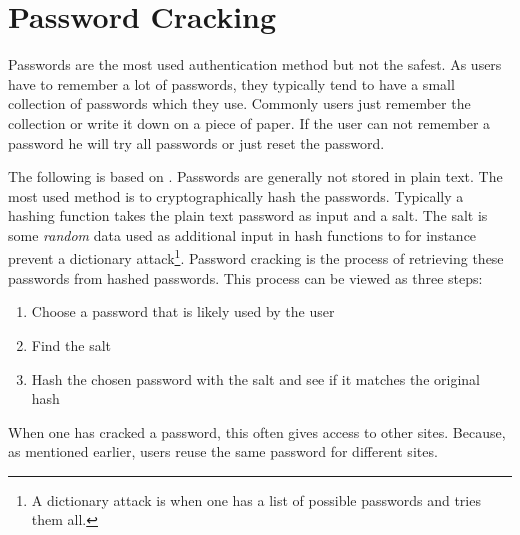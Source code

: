 \section{Password Cracking}\label{password_cracking}
Passwords are the most used authentication method but not the safest.
As users have to remember a lot of passwords, they typically tend to have a small collection of passwords which they use.
Commonly users just remember the collection or write it down on a piece of paper.
If the user can not remember a password he will try all passwords or just reset the password.\cite{florencio2007large}\cite{bishop1995improving}\cite{dell2010password}

The following is based on \citet{marechal2008advances}.
Passwords are generally not stored in plain text.
The most used method is to cryptographically hash the passwords.
Typically a hashing function takes the plain text password as input and a salt.
The salt is some \textit{random} data used as additional input in hash functions to for instance prevent a dictionary attack\footnote{A dictionary attack is when one has a list of possible passwords and tries them all.}.
Password cracking is the process of retrieving these passwords from hashed passwords.
This process can be viewed as three steps:
\begin{enumerate}
\item Choose a password that is likely used by the user
\item Find the salt
\item Hash the chosen password with the salt and see if it matches the original hash
\end{enumerate}

When one has cracked a password, this often gives access to other sites.
Because, as mentioned earlier, users reuse the same password for different sites.


